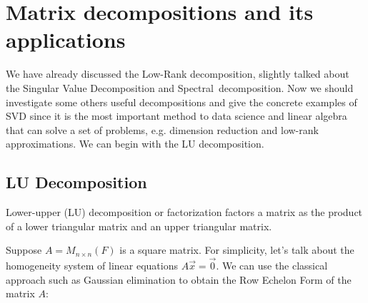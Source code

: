 \setcounter{section}{2}
\section{Matrix decompositions and its applications}
\par 
We have already discussed the Low-Rank decomposition, slightly talked about the Singular Value Decomposition and \mbox{Spectral decomposition}. Now we should investigate some others useful decompositions and give the concrete examples of SVD since it is the most important method to data science and linear algebra that can solve a set of problems, e.g. dimension reduction and low-rank approximations. We can begin with the LU decomposition.

\subsection*{LU Decomposition}
Lower-upper (LU) decomposition or factorization factors a matrix as the product of a lower triangular matrix and an upper triangular matrix. 
\par
Suppose $A = M_{n \times n}(F)$ is a square matrix. For simplicity, let's talk about the homogeneity system of linear equations $A\vec{x} = \vec{0}$. We can use the classical approach such as Gaussian elimination to obtain the Row Echelon Form of the matrix $A$:

